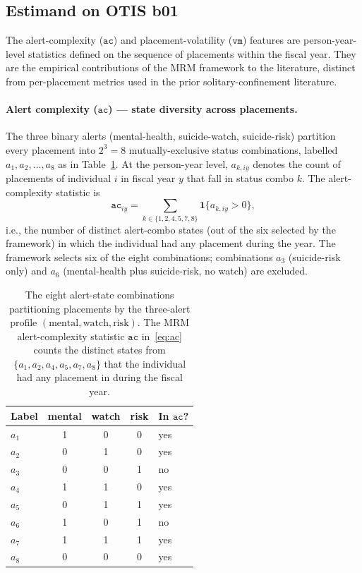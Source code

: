 \documentclass[article,shortnames,nojss]{jss}
\newcommand{\OTIS}{\textsf{OTIS}}
\newcommand{\ac}{\texttt{ac}}
\newcommand{\vm}{\texttt{vm}}
\begin{document}
\subsection[Estimand on OTIS b01]{Estimand on \OTIS{} b01}
\label{sec:methods-estimand}

The alert-complexity ($\ac$) and placement-volatility ($\vm$) features
are person-year-level statistics defined on the sequence of placements
within the fiscal year. They are the empirical contributions of the MRM
framework to the literature, distinct from per-placement metrics used
in the prior solitary-confinement literature.

\paragraph{Alert complexity ($\ac$) — state diversity across placements.}
The three binary alerts (mental-health, suicide-watch, suicide-risk)
partition every placement into $2^{3} = 8$ mutually-exclusive
status combinations, labelled $a_{1}, a_{2}, \dots, a_{8}$ as in
Table~\ref{tab:status-combos}. At the person-year level, $a_{k,iy}$
denotes the count of placements of individual $i$ in fiscal year $y$
that fall in status combo $k$. The alert-complexity statistic is
\begin{equation}
\label{eq:ac}
  \ac_{iy} = \sum_{k \in \{1,2,4,5,7,8\}} \mathbf{1}\{a_{k,iy} > 0\},
\end{equation}
i.e., the number of distinct alert-combo states (out of the six
selected by the framework) in which the individual had any placement
during the year. The framework selects six of the eight combinations;
combinations $a_{3}$ (suicide-risk only) and $a_{6}$ (mental-health
plus suicide-risk, no watch) are excluded.

\begin{table}[h]
\centering
\caption{The eight alert-state combinations partitioning placements
by the three-alert profile $(\text{mental}, \text{watch}, \text{risk})$.
The MRM alert-complexity statistic $\ac$
in~\eqref{eq:ac} counts the distinct states from $\{a_{1}, a_{2},
a_{4}, a_{5}, a_{7}, a_{8}\}$ that the individual had any placement in
during the fiscal year.}
\label{tab:status-combos}
\small
\begin{tabular}{lccc l}
\toprule
Label & mental & watch & risk & In $\ac$? \\
\midrule
$a_{1}$ & 1 & 0 & 0 & yes \\
$a_{2}$ & 0 & 1 & 0 & yes \\
$a_{3}$ & 0 & 0 & 1 & no  \\
$a_{4}$ & 1 & 1 & 0 & yes \\
$a_{5}$ & 0 & 1 & 1 & yes \\
$a_{6}$ & 1 & 0 & 1 & no  \\
$a_{7}$ & 1 & 1 & 1 & yes \\
$a_{8}$ & 0 & 0 & 0 & yes \\
\bottomrule
\end{tabular}
\end{table}
\end{document}
